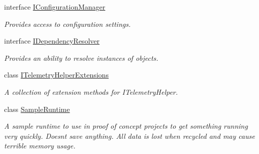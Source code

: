 \begin{DoxyCompactItemize}
interface \hyperlink{interfaceCqrs_1_1Configuration_1_1IConfigurationManager}{I\+Configuration\+Manager}
\begin{DoxyCompactList}\small\item\em Provides access to configuration settings. \end{DoxyCompactList}\item 
interface \hyperlink{interfaceCqrs_1_1Configuration_1_1IDependencyResolver}{I\+Dependency\+Resolver}
\begin{DoxyCompactList}\small\item\em Provides an ability to resolve instances of objects. \end{DoxyCompactList}\item 
class \hyperlink{classCqrs_1_1Configuration_1_1ITelemetryHelperExtensions}{I\+Telemetry\+Helper\+Extensions}
\begin{DoxyCompactList}\small\item\em A collection of extension methods for I\+Telemetry\+Helper. \end{DoxyCompactList}\item 
class \hyperlink{classCqrs_1_1Configuration_1_1SampleRuntime}{Sample\+Runtime}
\begin{DoxyCompactList}\small\item\em A sample runtime to use in proof of concept projects to get something running very quickly. Doesn\textquotesingle{}t save anything. All data is lost when recycled and may cause terrible memory usage. \end{DoxyCompactList}\end{DoxyCompactItemize}
